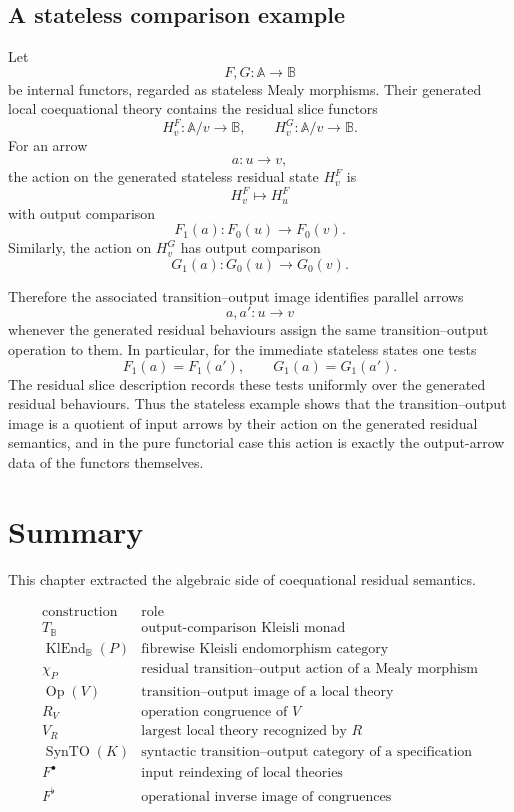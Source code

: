 \subsection{A stateless comparison example}
\label{subsec:to-stateless-comparison-example}

Let
\[
    F,G:\mathbb A\to\mathbb B
\]
be internal functors, regarded as stateless Mealy morphisms. Their generated
local coequational theory contains the residual slice functors
\[
    H^F_v:\mathbb A/v\to\mathbb B,
    \qquad
    H^G_v:\mathbb A/v\to\mathbb B.
\]
For an arrow
\[
    a:u\to v,
\]
the action on the generated stateless residual state \(H^F_v\) is
\[
    H^F_v\longmapsto H^F_u
\]
with output comparison
\[
    F_1(a):F_0(u)\to F_0(v).
\]
Similarly, the action on \(H^G_v\) has output comparison
\[
    G_1(a):G_0(u)\to G_0(v).
\]

Therefore the associated transition--output image identifies parallel arrows
\[
    a,a':u\to v
\]
whenever the generated residual behaviours assign the same transition--output
operation to them. In particular, for the immediate stateless states one tests
\[
    F_1(a)=F_1(a'),
    \qquad
    G_1(a)=G_1(a').
\]
The residual slice description records these tests uniformly over the generated
residual behaviours. Thus the stateless example shows that the
transition--output image is a quotient of input arrows by their action on the
generated residual semantics, and in the pure functorial case this action is
exactly the output-arrow data of the functors themselves.

\section{Summary}
\label{sec:syntactic-to-summary}

This chapter extracted the algebraic side of coequational residual semantics.

\[
\begin{array}{c|l}
\text{construction} & \text{role} \\
\hline
T_{\mathbb B}
&
\text{output-comparison Kleisli monad}
\\
\operatorname{KlEnd}_{\mathbb B}(P)
&
\text{fibrewise Kleisli endomorphism category}
\\
\chi_P
&
\text{residual transition--output action of a Mealy morphism}
\\
\operatorname{Op}(V)
&
\text{transition--output image of a local theory}
\\
R_V
&
\text{operation congruence of }V
\\
V_R
&
\text{largest local theory recognized by }R
\\
\operatorname{SynTO}(K)
&
\text{syntactic transition--output category of a specification}
\\
F^\bullet
&
\text{input reindexing of local theories}
\\
F^\flat
&
\text{operational inverse image of congruences}
\end{array}
\]

